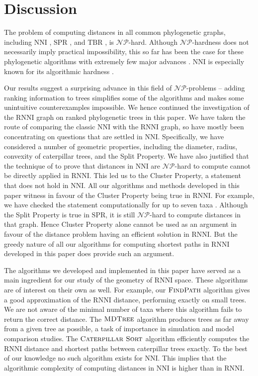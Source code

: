 \documentclass{amsart}
\newcommand{\np}{\mathcal{NP}}
\newcommand{\nni}{\mathrm{NNI}}
\newcommand{\rnni}{\mathrm{RNNI}}
\newcommand{\tbr}{\mathrm{TBR}}
\newcommand{\spr}{\mathrm{SPR}}
\newcommand{\csort}{\textsc{Caterpillar Sort}}
\newcommand{\findpath}{\textsc{FindPath}}
\newcommand{\mdtree}{\textsc{MDTree}}
\begin{document}
\section{Discussion}

The problem of computing distances in all common phylogenetic graphs, including $\nni$ \autocite{Dasgupta2000-xa}, $\spr$ \autocite{Bordewich2005-nx}, and $\tbr$ \autocite{Allen2001-ky}, is $\np$-hard.
Although $\np$-hardness does not necessarily imply practical impossibility, this so far has been the case for these phylogenetic algorithms with extremely few major advances \autocite{Whidden2010-bw}.
$\nni$ is especially known for its algorithmic hardness \autocite{Whidden2018-fw}.

Our results suggest a surprising advance in this field of $\np$-problems -- adding ranking information to trees simplifies some of the algorithms and makes some unintuitive counterexamples impossible.
We hence continued the investigation of the $\rnni$ graph on ranked phylogenetic trees in this paper.
We have taken the route of comparing the classic $\nni$ with the $\rnni$ graph, so have mostly been concentrating on questions that are settled in $\nni$.
Specifically, we have considered a number of geometric properties, including the diameter, radius, convexity of caterpillar trees, and the Split Property.
We have also justified that the technique of \textcite{Dasgupta2000-xa} to prove that distances in $\nni$ are $\np$-hard to compute cannot be directly applied in $\rnni$.
This led us to the Cluster Property, a statement that does not hold in $\nni$.
All our algorithms and methods developed in this paper witness in favour of the Cluster Property being true in $\rnni$.
For example, we have checked the statement computationally for up to seven taxa \autocite{Collienne2019}.
Although the Split Property is true in $\spr$, it is still $\np$-hard to compute distances in that graph.
Hence Cluster Property alone cannot be used as an argument in favour of the distance problem having an efficient solution in $\rnni$.
But the greedy nature of all our algorithms for computing shortest paths in $\rnni$ developed in this paper does provide such an argument.

The algorithms we developed and implemented in this paper have served as a main ingredient for our study of the geometry of $\rnni$ space.
These algorithms are of interest on their own as well.
For example, our $\findpath$ algorithm gives a good approximation of the $\rnni$ distance, performing exactly on small trees.
We are not aware of the minimal number of taxa where this algorithm fails to return the correct distance.
The $\mdtree$ algorithm produces trees as far away from a given tree as possible, a task of importance in simulation and model comparison studies.
The $\csort$ algorithm efficiently computes the $\rnni$ distance and shortest paths between caterpillar trees exactly.
To the best of our knowledge no such algorithm exists for $\nni$.
This implies that the algorithmic complexity of computing distances in $\nni$ is higher than in $\rnni$.
\end{document}
